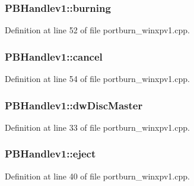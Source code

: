 \subsubsection[{\texorpdfstring{burning}{burning}}]{ P\+B\+Handlev1\+::burning}\hypertarget{struct_p_b_handlev1_a4e0c7db95644de79506ae3c78f4c0deb}{}\label{struct_p_b_handlev1_a4e0c7db95644de79506ae3c78f4c0deb}


Definition at line 52 of file portburn\+\_\+winxpv1.\+cpp.

\subsubsection[{\texorpdfstring{cancel}{cancel}}]{ P\+B\+Handlev1\+::cancel}\hypertarget{struct_p_b_handlev1_a7376ee290aef4efc91f3e9dcb52f9678}{}\label{struct_p_b_handlev1_a7376ee290aef4efc91f3e9dcb52f9678}


Definition at line 54 of file portburn\+\_\+winxpv1.\+cpp.

\subsubsection[{\texorpdfstring{dw\+Disc\+Master}{dwDiscMaster}}]{ P\+B\+Handlev1\+::dw\+Disc\+Master}\hypertarget{struct_p_b_handlev1_a578fc9c6741b228094c455e185ee9e5a}{}\label{struct_p_b_handlev1_a578fc9c6741b228094c455e185ee9e5a}


Definition at line 33 of file portburn\+\_\+winxpv1.\+cpp.

\subsubsection[{\texorpdfstring{eject}{eject}}]{ P\+B\+Handlev1\+::eject}\hypertarget{struct_p_b_handlev1_a8037534f1e2ec1565fa8a9f0d9806fbe}{}\label{struct_p_b_handlev1_a8037534f1e2ec1565fa8a9f0d9806fbe}


Definition at line 40 of file portburn\+\_\+winxpv1.\+cpp.

